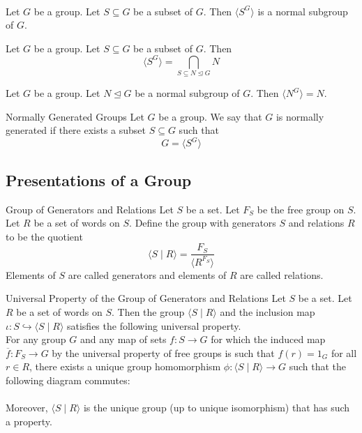 \documentclass[a4paper]{article}
\begin{document}
\begin{lmm}{}{}\\
Let $G$ be a group. Let $S\subseteq G$ be a subset of $G$. Then $\langle S^G\rangle$ is a normal subgroup of $G$. 
\end{lmm}

\begin{lmm}{}{} Let $G$ be a group. Let $S\subseteq G$ be a subset of $G$. Then $$\langle S^G\rangle=\bigcap_{S\subseteq N\trianglelefteq G}N$$
\end{lmm}

\begin{lmm}{}{} Let $G$ be a group. Let $N\trianglelefteq G$ be a normal subgroup of $G$. Then $\langle N^G\rangle=N$. 
\end{lmm}

\begin{defn}{Normally Generated Groups}{} Let $G$ be a group. We say that $G$ is normally generated if there exists a subset $S\subseteq G$ such that $$G=\langle S^G\rangle$$
\end{defn}

\subsection{Presentations of a Group}
\begin{defn}{Group of Generators and Relations}{} Let $S$ be a set. Let $F_S$ be the free group on $S$. Let $R$ be a set of words on $S$. Define the group with generators $S$ and relations $R$ to be the quotient $$\langle S\;|\;R\rangle=\frac{F_S}{\langle R^{F_S}\rangle}$$ Elements of $S$ are called generators and elements of $R$ are called relations. 
\end{defn}

\begin{prp}{Universal Property of the Group of Generators and Relations}{} Let $S$ be a set. Let $R$ be a set of words on $S$. Then the group $\langle S\;|\;R\rangle$ and the inclusion map $\iota:S\hookrightarrow\langle S\;|\;R\rangle$ satisfies the following universal property. \\

For any group $G$ and any map of sets $f:S\to G$ for which the induced map $\overline{f}:F_S\to G$ by the universal property of free groups is such that $f(r)=1_G$ for all $r\in R$, there exists a unique group homomorphism $\phi:\langle S\;|\;R\rangle\to G$ such that the following diagram commutes: \\
 \\
Moreover, $\langle S\;|\;R\rangle$ is the unique group (up to unique isomorphism) that has such a property. 
\end{prp}
\end{document}
